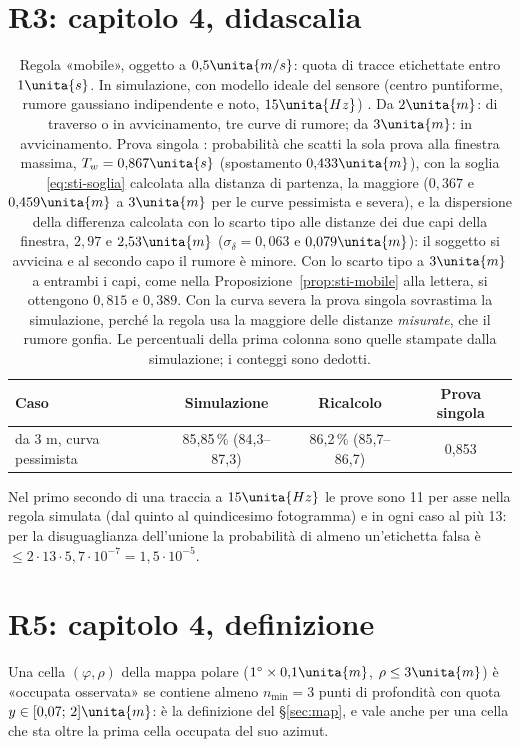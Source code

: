 \section*{R3: capitolo 4, didascalia}
\begin{table}[H]\centering\footnotesize
\caption{Regola «mobile», oggetto a $0{,}5\unita{m/s}$: quota di tracce etichettate entro $1\unita{s}$. In simulazione, con modello ideale del sensore (centro puntiforme, rumore gaussiano indipendente e noto, $15\unita{Hz}$) . Da $2\unita{m}$: di traverso o in avvicinamento, tre curve di rumore; da $3\unita{m}$: in avvicinamento. Prova singola : probabilità che scatti la sola prova alla finestra massima, $T_w=0{,}867\unita{s}$ (spostamento $0{,}433\unita{m}$), con la soglia \eqref{eq:sti-soglia} calcolata alla distanza di partenza, la maggiore ($0{,}367$ e $0{,}459\unita{m}$ a $3\unita{m}$ per le curve pessimista e severa), e la dispersione della differenza calcolata con lo scarto tipo alle distanze dei due capi della finestra, $2{,}97$ e $2{,}53\unita{m}$ ($\sigma_\delta=0{,}063$ e $0{,}079\unita{m}$): il soggetto si avvicina e al secondo capo il rumore è minore. Con lo scarto tipo a $3\unita{m}$ a entrambi i capi, come nella Proposizione~\ref{prop:sti-mobile} alla lettera, si ottengono $0{,}815$ e $0{,}389$. Con la curva severa la prova singola sovrastima la simulazione, perché la regola usa la maggiore delle distanze \emph{misurate}, che il rumore gonfia. Le percentuali della prima colonna sono quelle stampate dalla simulazione; i conteggi sono dedotti.}\label{tab:sti-mobile}
\begin{tabular}{lccc}\toprule
Caso & Simulazione & Ricalcolo & Prova singola\\\midrule
da 3 m, curva pessimista & 85,85\,\% (84,3--87,3) & 86,2\,\% (85,7--86,7) & 0,853\\
\bottomrule\end{tabular}
\end{table}
Nel primo secondo di una traccia a $15\unita{Hz}$ le prove sono 11 per asse nella regola simulata (dal quinto al quindicesimo fotogramma) e in ogni caso al più 13: per la disuguaglianza dell'unione la probabilità di almeno un'etichetta falsa è $\le2\cdot13\cdot5{,}7\cdot10^{-7}=1{,}5\cdot10^{-5}$.

\section*{R5: capitolo 4, definizione}
Una cella $(\varphi,\rho)$ della mappa polare ($1^\circ\times0{,}1\unita{m}$, $\rho\le3\unita{m}$) è «occupata osservata» se contiene almeno $n_{\min}=3$ punti di profondità con quota $y\in[0{,}07;\,2]\unita{m}$: è la definizione del \S\ref{sec:map}, e vale anche per una cella che sta oltre la prima cella occupata del suo azimut.


